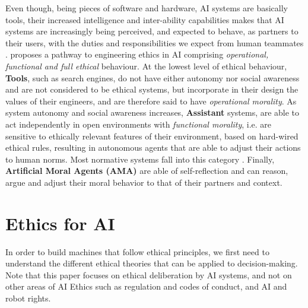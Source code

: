 \documentclass[twocolumn]{article}
\begin{document}
Even though, being pieces of software and hardware, AI systems are basically tools, their increased intelligence and inter-ability capabilities makes that AI systems are increasingly being perceived, and expected to behave, as partners to their users, with the duties and responsibilities we expect from human teammates \cite{casa12}. 
\cite{wallach2008moral} proposes a pathway to engineering ethics in AI comprising \textit{operational, functional and full ethical} behaviour.  At the lowest level of ethical behaviour, \textbf{Tools}, such as search engines, do not have either autonomy nor social awareness and are not considered to be ethical systems, but incorporate in their design the values of their engineers, and are therefore said to have \textit{operational morality}. As system autonomy and social awareness increases, \textbf{Assistant} systems, are able to act independently in open environments with \textit{functional morality}, i.e. are sensitive to ethically relevant features of their environment, based on hard-wired ethical rules, resulting in autonomous agents that are able to adjust their actions to human norms. Most normative systems fall into this category \cite{conte1998autonomous,boella2006introduction}. Finally, \textbf{Artificial Moral Agents (AMA)} are able of self-reflection and can reason, argue and adjust their moral behavior to that of their partners and context. %

\section{Ethics for AI}\label{sec:ethics}
In order to build machines that follow ethical principles, we first need to understand the different ethical theories that can be applied to decision-making. Note that this paper  focuses on ethical deliberation by AI systems, and not on other areas of AI Ethics such as regulation and codes of conduct, and AI and robot rights.

\end{document}
